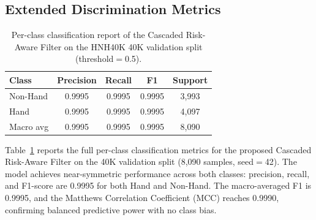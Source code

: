 \documentclass{bmvc2k}
\begin{document}
\subsection{Extended Discrimination Metrics}
\label{sec:supp-discrim}

\begin{table}[H]
\centering
\footnotesize

\vspace{2mm}
\begin{tabular}{@{}l c c c c@{}}
\hline
\textbf{Class} & \textbf{Precision} & \textbf{Recall} & \textbf{F1} & \textbf{Support} \\
\hline
Non-Hand & 0.9995 & 0.9995 & 0.9995 & 3{,}993 \\
Hand & 0.9995 & 0.9995 & 0.9995 & 4{,}097 \\
\hline
Macro avg & 0.9995 & 0.9995 & 0.9995 & 8{,}090 \\
\hline
\end{tabular}
\vspace{3mm}
\caption{Per-class classification report of the Cascaded Risk-Aware Filter on the HNH40K 40K validation split (threshold$=$0.5).}
\label{tab:supp-classreport}
\end{table}
Table~\ref{tab:supp-classreport} reports the full per-class classification metrics for the proposed Cascaded Risk-Aware Filter on the 40K validation split (8{,}090 samples, seed$=$42). The model achieves near-symmetric performance across both classes: precision, recall, and F1-score are 0.9995 for both Hand and Non-Hand. The macro-averaged F1 is 0.9995, and the Matthews Correlation Coefficient (MCC) reaches 0.9990, confirming balanced predictive power with no class bias.
\end{document}
